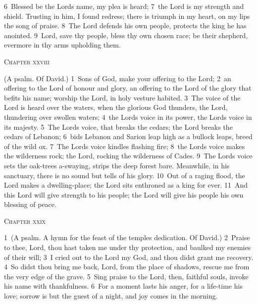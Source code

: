 \documentclass[10pt]{book} %
\begin{document}
\textcolor{benred8}{6}~Blessed be the Lord\textquotesingle s name, my plea is heard; \textcolor{benred8}{7}~the Lord is my strength and shield. Trusting in him, I found redress; there is triumph in my heart, on my lips the song of praise. \textcolor{benred8}{8}~The Lord defends his own people, protects the king he has anointed. \textcolor{benred8}{9}~Lord, save thy people, bless thy own chosen race; be their shepherd, evermore in thy arms upholding them.
\begin{large}\begin{center}\textsc{Chapter xxviii}\end{center}\end{large}
(A psalm. Of David.)
\textcolor{benred8}{1}~Sons of God, make your offering to the Lord; \textcolor{benred8}{2}~an offering to the Lord of honour and glory, an offering to the Lord of the glory that befits his name; worship the Lord, in holy vesture habited. \textcolor{benred8}{3}~The voice of the Lord is heard over the waters, when the glorious God thunders, the Lord, thundering over swollen waters; \textcolor{benred8}{4}~the Lord\textquotesingle s voice in its power, the Lord\textquotesingle s voice in its majesty. \textcolor{benred8}{5}~The Lord\textquotesingle s voice, that breaks the cedars; the Lord breaks the cedars of Lebanon; \textcolor{benred8}{6}~bids Lebanon and Sarion leap high as a bullock leaps, breed of the wild ox. \textcolor{benred8}{7}~The Lord\textquotesingle s voice kindles flashing fire; \textcolor{benred8}{8}~the Lord\textquotesingle s voice makes the wilderness rock; the Lord, rocking the wilderness of Cades. \textcolor{benred8}{9}~The Lord\textquotesingle s voice sets the oak-trees a-swaying, strips the deep forest bare. Meanwhile, in his sanctuary, there is no sound but tells of his glory. \textcolor{benred8}{10}~Out of a raging flood, the Lord makes a dwelling-place; the Lord sits enthroned as a king for ever. \textcolor{benred8}{11}~And this Lord will give strength to his people; the Lord will give his people his own blessing of peace.
\begin{large}\begin{center}\textsc{Chapter xxix}\end{center}\end{large}
\textcolor{benred8}{1}~(A psalm. A hymn for the feast of the temple\textquotesingle s dedication. Of David.)
\textcolor{benred8}{2}~Praise to thee, Lord, thou hast taken me under thy protection, and baulked my enemies of their will; \textcolor{benred8}{3}~I cried out to the Lord my God, and thou didst grant me recovery. \textcolor{benred8}{4}~So didst thou bring me back, Lord, from the place of shadows, rescue me from the very edge of the grave. \textcolor{benred8}{5}~Sing praise to the Lord, then, faithful souls, invoke his name with thankfulness. \textcolor{benred8}{6}~For a moment lasts his anger, for a life-time his love; sorrow is but the guest of a night, and joy comes in the morning.
\end{document}
